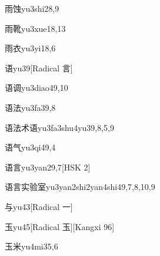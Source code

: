\begin{entry}{雨蚀}{yu3shi2}{8,9}
\end{entry}

\begin{entry}{雨靴}{yu3xue1}{8,13}
\end{entry}

\begin{entry}{雨衣}{yu3yi1}{8,6}
\end{entry}

\begin{entry}{语}{yu3}{9}[Radical 言]
\end{entry}

\begin{entry}{语调}{yu3diao4}{9,10}
\end{entry}

\begin{entry}{语法}{yu3fa3}{9,8}
\end{entry}

\begin{entry}{语法术语}{yu3fa3shu4yu3}{9,8,5,9}
\end{entry}

\begin{entry}{语气}{yu3qi4}{9,4}
\end{entry}

\begin{entry}{语言}{yu3yan2}{9,7}[HSK 2]
\end{entry}

\begin{entry}{语言实验室}{yu3yan2shi2yan4shi4}{9,7,8,10,9}
\end{entry}

\begin{entry}{与}{yu4}{3}[Radical 一]
\end{entry}

\begin{entry}{玉}{yu4}{5}[Radical 玉][Kangxi 96]
\end{entry}

\begin{entry}{玉米}{yu4mi3}{5,6}
\end{entry}

